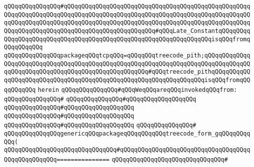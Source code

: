 \verb|qQQqqQQqqQQqqQQq#qQQqqQQqqQQqqQQqqQQqqQQqqQQqqQQqqQQqqQQqqQQqqQQqqQQqqQQqqQQqqQQqqQQqqQQqqQQqqQQqqQQqqQQqqQQqqQQqqQQqqQQqqQQqqQQqqQQqqQQqqQQqqQQqqQQqqQQqqQQqqQQqqQQqqQQqqQQqqQQqqQQqqQQqqQQqqQQqqQQqqQQqqQQqqQQqqQQqqQQqqQQqqQQqqQQqqQQqqQQqqQQqqQQqqQQqqQQq#qQQqLate_ConstantqQQqqQQqqQQqqQQqqQQqqQQqqQQqqQQqqQQqqQQqqQQqqQQqqQQqqQQqqQQqqQQqqQQqisqQQqfromqQQqqQQqqQQq|\newline
\verb|qQQqqQQqqQQqqQQqpackageqQQqtcpqQQq=qQQqqQQqtreecode_pith;qQQqqQQqqQQqqQQqqQQqqQQqqQQqqQQqqQQqqQQqqQQqqQQqqQQqqQQqqQQqqQQqqQQqqQQqqQQqqQQqqQQqqQQqqQQqqQQqqQQqqQQqqQQqqQQqqQQqqQQqqQQq#qQQqtreecode_pithqQQqqQQqqQQqqQQqqQQqqQQqqQQqqQQqqQQqqQQqqQQqqQQqqQQqqQQqqQQqqQQqqQQqisqQQqfromqQQqqQQqqQQq|\newline
\verb|herein|\newline
\newline
\verb|qQQqqQQqqQQqqQQq#qQQqWeqQQqareqQQqinvokedqQQqfrom:|\newline
\verb|qQQqqQQqqQQqqQQq#|\newline
\verb|qQQqqQQqqQQqqQQq#qQQqqQQqqQQqqQQqqQQq|\newline
\verb|qQQqqQQqqQQqqQQq#qQQqqQQqqQQqqQQqqQQq|\newline
\verb|qQQqqQQqqQQqqQQq#qQQqqQQqqQQqqQQqqQQq|\newline
\verb|qQQqqQQqqQQqqQQq#qQQqqQQqqQQqqQQqqQQq|\newline
\verb|qQQqqQQqqQQqqQQq#|\newline
\verb|qQQqqQQqqQQqqQQqgenericqQQqpackageqQQqqQQqqQQqtreecode_form_gqQQqqQQqqQQq(|\newline
\verb|qQQqqQQqqQQqqQQqqQQqqQQqqQQqqQQq#qQQqqQQqqQQqqQQqqQQqqQQqqQQqqQQqqQQqqQQqqQQqqQQqqQQq===============|\newline
\verb|qQQqqQQqqQQqqQQqqQQqqQQqqQQqqQQq#|\newline
